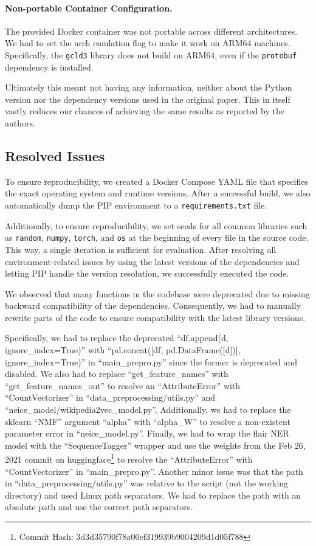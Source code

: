 \documentclass[manuscript]{acmart}
\begin{document}
\paragraph{Non-portable Container Configuration.} The provided Docker container was not portable across different architectures. We had to set the arch emulation flag to make it work on ARM64 machines. Specifically, the \texttt{gcld3} library does not build on ARM64, even if the \texttt{protobuf} dependency is installed.

Ultimately this meant not having any information, neither about the Python version nor the dependency versions used in the original paper. This in itself vastly reduces our chances of achieving the same results as reported by the authors.

\subsection{Resolved Issues}

To ensure reproducibility, we created a Docker Compose YAML file that specifies the exact operating system and runtime versions. After a successful build, we also automatically dump the PIP environment to a \texttt{requirements.txt} file.

Additionally, to ensure reproducibility, we set seeds for all common libraries such as \texttt{random}, \texttt{numpy}, \texttt{torch}, and \texttt{os} at the beginning of every file in the source code. This way, a single iteration is sufficient for evaluation. After resolving all environment-related issues by using the latest versions of the dependencies and letting PIP handle the version resolution, we successfully executed the code.

We observed that many functions in the codebase were deprecated due to missing backward compatibility of the dependencies. Consequently, we had to manually rewrite parts of the code to ensure compatibility with the latest library versions.

Specifically, we had to replace the deprecated ``df.append(d, ignore\_index=True)'' with ``pd.concat([df, pd.DataFrame([d])], ignore\_index=True)'' in ``main\_prepro.py'' since the former is deprecated and disabled. We also had to replace ``get\_feature\_names'' with ``get\_feature\_names\_out'' to resolve an ``AttributeError'' with ``CountVectorizer'' in ``data\_preprocessing/utils.py'' and ``neice\_model/wikipedia2vec\_model.py''. Additionally, we had to replace the sklearn ``NMF'' argument ``alpha'' with ``alpha\_W'' to resolve a non-existent parameter error in ``neice\_model.py''. Finally, we had to wrap the flair NER model with the ``SequenceTagger'' wrapper and use the weights from the Feb 26, 2021 commit on huggingface\footnote{Commit Hash: 3d3d35790f78a00ef319939b9004209d1d05f788} to resolve the ``AttributeError'' with ``CountVectorizer'' in ``main\_prepro.py''. Another minor issue was that the path in ``data\_preprocessing/utils.py'' was relative to the script (not the working directory) and used Linux path separators. We had to replace the path with an absolute path and use the correct path separators.
\end{document}
